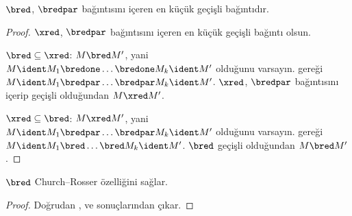 \begin{lem}
  $\bred$, $\bredpar$ bağıntısını içeren en küçük geçişli bağıntıdır.
\end{lem}

\begin{proof}
  $\xred$, $\bredpar$ bağıntısını içeren en küçük geçişli bağıntı olsun.

  $\bred \subseteq \xred$: $M\bred M'$, yani
  $M\ident M_1\bredone\dots\bredone M_k\ident M'$ olduğunu varsayın.
   gereği
  $M\ident M_1\bredpar\dots\bredpar M_k\ident M'$. $\xred$, $\bredpar$
  bağıntısını içerip geçişli olduğundan $M\xred M'$.

  $\xred \subseteq \bred$: $M\xred M'$, yani
  $M\ident M_1\bredpar\dots\bredpar M_k\ident M'$ olduğunu varsayın.
   gereği
  $M\ident M_1\bred\dots\bred M_k\ident M'$. $\bred$ geçişli olduğundan
  $M\bred M'$.
\end{proof}

\begin{thm}
  $\bred$ Church--Rosser özelliğini sağlar.
\end{thm}

\begin{proof}
  Doğrudan ,  ve 
  sonuçlarından çıkar.
\end{proof}

